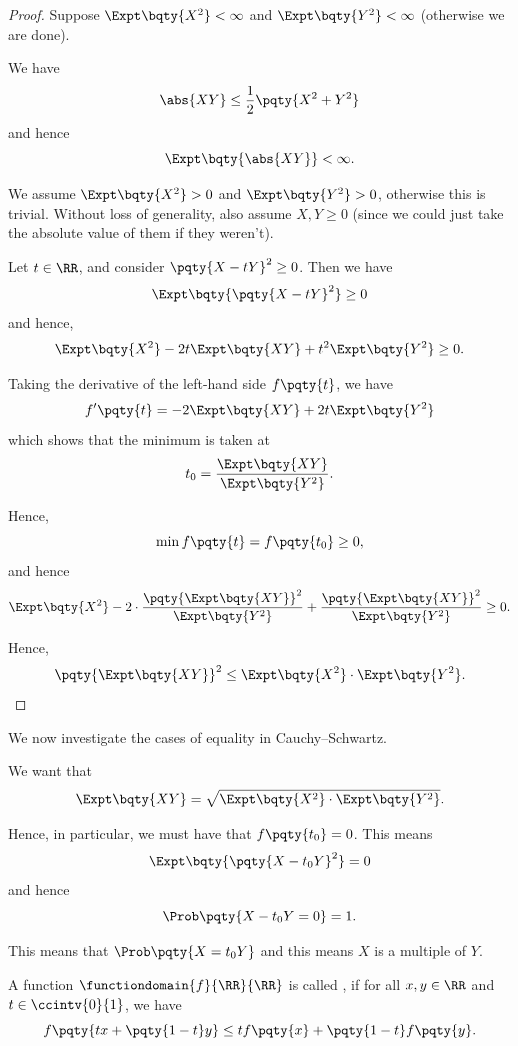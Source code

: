 \begin{proof}
    Suppose \(\Expt\bqty{X^2} < \infty\) and \(\Expt\bqty{Y^2} < \infty\) (otherwise we are done).

    We have
    \[
        \abs{XY} \leq \frac{1}{2} \pqty{X^2 + Y^2}
    \]
    and hence
    \[
        \Expt\bqty{\abs{XY}} < \infty.
    \]

    We assume \(\Expt\bqty{X^2} > 0\) and \(\Expt\bqty{Y^2} > 0\), otherwise this is trivial. Without loss of generality, also assume \(X, Y \geq 0\) (since we could just take the absolute value of them if they weren't).

    Let \(t \in \RR\), and consider \(\pqty{X - tY}^2 \geq 0\). Then we have
    \[
        \Expt\bqty{\pqty{X - tY}^2} \geq 0
    \]
    and hence,
    \[
        \Expt\bqty{X^2} - 2t \Expt\bqty{XY} + t^2 \Expt\bqty{Y^2} \geq 0.
    \]

    Taking the derivative of the left-hand side \(f\pqty{t}\), we have
    \[
        f'\pqty{t} = -2 \Expt\bqty{XY} + 2t \Expt\bqty{Y^2}
    \]
    which shows that the minimum is taken at
    \[
        t_0 = \frac{\Expt\bqty{XY}}{\Expt\bqty{Y^2}}.
    \]

    Hence,
    \[
        \min f\pqty{t} = f\pqty{t_0} \geq 0,
    \]
    and hence
    \[
        \Expt\bqty{X^2} - 2 \cdot \frac{\pqty{\Expt\bqty{XY}}^2}{\Expt\bqty{Y^2}} + \frac{\pqty{\Expt\bqty{XY}}^2}{\Expt\bqty{Y^2}} \geq 0.
    \]

    Hence,
    \[
        \pqty{\Expt\bqty{XY}}^2 \leq \Expt\bqty{X^2} \cdot \Expt\bqty{Y^2}.
    \]
\end{proof}

We now investigate the cases of equality in Cauchy--Schwartz.

We want that
\[
    \Expt\bqty{XY} = \sqrt{\Expt\bqty{X^2} \cdot \Expt\bqty{Y^2}}.
\]

Hence, in particular, we must have that \(f\pqty{t_0} = 0\). This means
\[
    \Expt\bqty{\pqty{X - t_0 Y}^2} = 0
\]
and hence
\[
    \Prob\pqty{X - t_0 Y = 0} = 1.
\]

This means that \(\Prob\pqty{X = t_0 Y}\) and this means \(X\) is a multiple of \(Y\).

\begin{definition}
    \label{def:convex-fn}%
    A function \(\functiondomain{f}{\RR}{\RR}\) is called , if for all \(x, y \in \RR\) and \(t \in \ccintv{0}{1}\), we have
    \[
        f\pqty{tx + \pqty{1 - t} y} \leq t f\pqty{x} + \pqty{1 - t} f\pqty{y}.
    \]
\end{definition}

